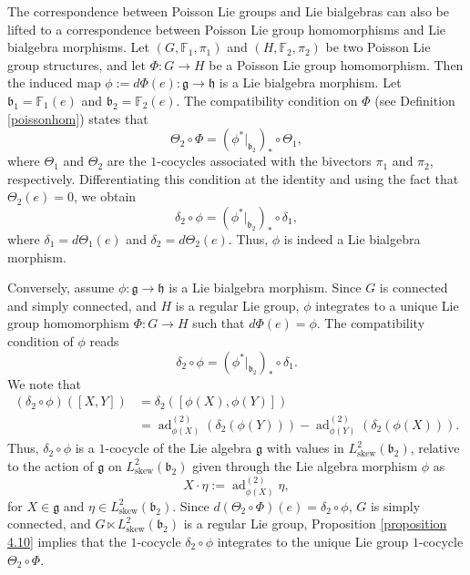\documentclass[11pt,reqno]{amsart}
\theoremstyle{definition}
\numberwithin{equation}{section}
\begin{document}
The correspondence between Poisson Lie groups and Lie bialgebras can also be lifted to a correspondence between Poisson Lie group homomorphisms and Lie bialgebra morphisms. Let $(G, \mathbb{F}_1, \pi_1)$ and $(H, \mathbb{F}_2, \pi_2)$ be two Poisson Lie group structures, and let $\Phi: G \to H$ be a Poisson Lie group homomorphism. Then the induced map $\phi := d\Phi(e): \mathfrak{g} \to \mathfrak{h}$ is a Lie bialgebra morphism. Let $\mathfrak{b}_1 = \mathbb{F}_1(e)$ and $\mathfrak{b}_2 = \mathbb{F}_2(e)$. The compatibility condition on $\Phi$ (see Definition \ref{poissonhom}) states that
\[
\Theta_2 \circ \Phi = (\phi^*|_{\mathfrak{b}_2})_* \circ \Theta_1,
\]
where $\Theta_1$ and $\Theta_2$ are the $1$-cocycles associated with the bivectors $\pi_1$ and $\pi_2$, respectively. Differentiating this condition at the identity and using the fact that $\Theta_2(e) = 0$, we obtain
\[
\delta_2 \circ \phi = (\phi^*|_{\mathfrak{b}_2})_* \circ \delta_1,
\]
where $\delta_1 = d\Theta_1(e)$ and $\delta_2 = d\Theta_2(e)$. Thus, $\phi$ is indeed a Lie bialgebra morphism.

Conversely, assume $\phi: \mathfrak{g} \to \mathfrak{h}$ is a Lie bialgebra morphism. Since $G$ is connected and simply connected, and $H$ is a regular Lie group, $\phi$ integrates to a unique Lie group homomorphism $\Phi: G \to H$ such that $d\Phi(e) = \phi$. The compatibility condition of $\phi$ reads
\[
\delta_2 \circ \phi = (\phi^*|_{\mathfrak{b}_2})_* \circ \delta_1.
\]
We note that
\begin{align*}
(\delta_2 \circ \phi)([X,Y]) &= \delta_2([\phi(X), \phi(Y)]) \\
&= \operatorname{ad}_{\phi(X)}^{(2)}(\delta_2(\phi(Y))) - \operatorname{ad}^{(2)}_{\phi(Y)}(\delta_2(\phi(X))).
\end{align*}
Thus, $\delta_2 \circ \phi$ is a $1$-cocycle of the Lie algebra $\mathfrak{g}$ with values in $L^2_{\text{skew}}(\mathfrak{b}_2)$, relative to the action of $\mathfrak{g}$ on $L^2_{\text{skew}}(\mathfrak{b}_2)$ given through the Lie algebra morphism $\phi$ as
\[
X \cdot \eta := \operatorname{ad}^{(2)}_{\phi(X)}\eta,
\]
for $X \in \mathfrak{g}$ and $\eta \in L^2_{\text{skew}}(\mathfrak{b}_2)$. Since $d(\Theta_2 \circ \Phi)(e) = \delta_2 \circ \phi$, $G$ is simply connected, and $G \ltimes L^2_{\text{skew}}(\mathfrak{b}_2)$ is a regular Lie group, Proposition \ref{proposition 4.10} implies that the $1$-cocycle $\delta_2 \circ \phi$ integrates to the unique Lie group $1$-cocycle $\Theta_2 \circ \Phi$. 
\end{document}
